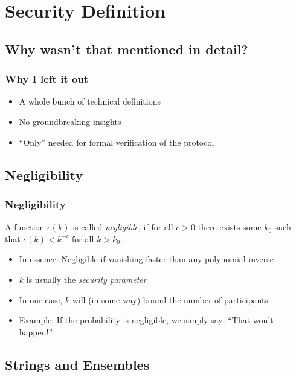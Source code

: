 \documentclass{beamer}
\begin{document}
\section{Security Definition}

\subsection{Why wasn't that mentioned in detail?}

\begin{frame}
  \frametitle{Why I left it out}
  \begin{itemize}
  \item A whole bunch of technical definitions
  \item No groundbreaking insights
  \item ``Only'' needed for formal verification of the protocol
  \end{itemize}
\end{frame}

\subsection{Negligibility}
\label{sec:negligibility}

\begin{frame}
  \frametitle{Negligibility}
  \begin{definition}[Negligibility]
    A function $\epsilon(k)$ is called \emph{negligible}, if for all $c>0$ there exists some $k_0$ such that $\epsilon(k) < k^{-c}$ for all $k>k_0$.
  \end{definition}
  \begin{itemize}
  \item In essence: Negligible if vanishing faster than any polynomial-inverse
  \item $k$ is usually the \emph{security parameter}
  \item In our case, $k$ will (in some way) bound the number of participants
  \item Example: If the probability is negligible, we simply say: ``That won't happen!''
  \end{itemize}
\end{frame}

\subsection{Strings and Ensembles}
\label{sec:strings-ensembles}
\end{document}
